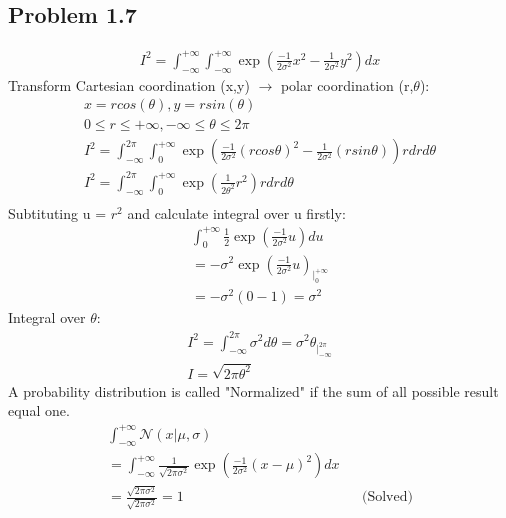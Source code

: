 \documentclass[12pt]{article}
\begin{document}
    \subsection*{Problem 1.7}
    \begin{align*}
        I^2  = \int_{-\infty}^{+\infty}\int_{-\infty}^{+\infty}\exp(\frac{-1}{2\sigma^2}x^2 - \frac{1}{2\sigma^2}y^2)dx 
    \end{align*}
    Transform Cartesian coordination (x,y) $\rightarrow$ polar coordination (r,$\theta$):
    \begin{align*}
        x = rcos(\theta), y = rsin(\theta) \\
        0 \leq r \leq +\infty, -\infty \leq \theta \leq 2\pi \\
        I^2 = \int_{-\infty}^{2\pi}\int_{0}^{+\infty}\exp(\frac{-1}{2\sigma^2}(rcos\theta)^2 - \frac{1}{2\sigma^2}(rsin\theta))rdrd\theta \\
        I^2 = \int_{-\infty}^{2\pi}\int_{0}^{+\infty}\exp(\frac{1}{2\theta^2}r^2)rdrd\theta \\
    \end{align*}
    Subtituting u = $r^2$ and calculate integral over u firstly:
    \begin{align*}
        \int_{0}^{+\infty}\frac{1}{2}\exp(\frac{-1}{2\sigma^2}u)du \\
        = -\sigma^2\exp(\frac{-1}{2\sigma^2}u)_{|_{0}^{+\infty}} \\
        = -\sigma^2(0 - 1) = \sigma^2
    \end{align*}
    Integral over $\theta$:
    \begin{align*}
        I^2 = \int_{-\infty}^{2\pi}\sigma^2d\theta = \sigma^2\theta_{|_{-\infty}^{2\pi}} \\
        I = \sqrt{2\pi\theta^2}
    \end{align*}
    A probability distribution is called "Normalized" if the sum of all possible result equal one.
    \begin{align*}
        \int_{-\infty}^{+\infty}\mathcal{N}(x|\mu,\sigma) \\
        = \int_{-\infty}^{+\infty}\frac{1}{\sqrt{2\pi\sigma^2}}\exp(\frac{-1}{2\sigma^2}(x - \mu)^2)dx \\
        = \frac{\sqrt{2\pi\sigma^2}}{\sqrt{2\pi\sigma^2}} = 1 && \text{(Solved)}
    \end{align*}
\end{document}
